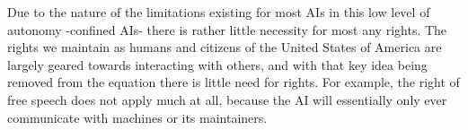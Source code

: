 Due to the nature of the limitations existing for most AIs in this low level of autonomy -confined AIs- there is rather little necessity for most any rights. The rights we maintain as humans and citizens of the United States of America are largely geared towards interacting with others, and with that key idea being removed from the equation there is little need for rights. For example, the right of free speech does not apply much at all, because the AI will essentially only ever communicate with machines or its maintainers.